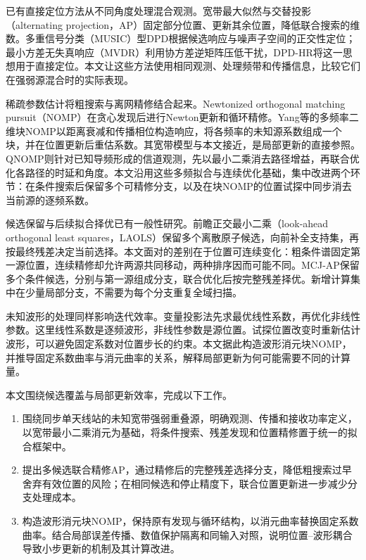 \documentclass[a4paper,fleqn]{cas-sc}
\numberwithin{equation}{section}
\numberwithin{figure}{section}
\numberwithin{table}{section}
\begin{document}
已有直接定位方法从不同角度处理混合观测。宽带最大似然与交替投影（alternating projection，AP）固定部分位置、更新其余位置，降低联合搜索的维数\cite{ChenHudsonYao2002}。多重信号分类（MUSIC）型DPD根据候选响应与噪声子空间的正交性定位\cite{WeissAmar2005}；最小方差无失真响应（MVDR）利用协方差逆矩阵压低干扰\cite{Capon1969}，DPD-HR将这一思想用于直接定位\cite{TirerWeiss2016}。本文让这些方法使用相同观测、处理频带和传播信息，比较它们在强弱源混合时的实际表现。

稀疏参数估计将粗搜索与离网精修结合起来。Newtonized orthogonal matching pursuit（NOMP）在贪心发现后进行Newton更新和循环精修\cite{Mamandipoor2016}。Yang等的多频率二维块NOMP以距离衰减和传播相位构造响应，将各频率的未知源系数组成一个块，并在位置更新后重估系数\cite{Yang2022}。其宽带模型与本文接近，是局部更新的直接参照。QNOMP则针对已知导频形成的信道观测，先以最小二乘消去路径增益，再联合优化各路径的时延和角度\cite{Zeng2025}。本文沿用这些多频拟合与连续优化基础，集中改进两个环节：在条件搜索后保留多个可精修分支，以及在块NOMP的位置试探中同步消去当前源的逐频系数。

候选保留与后续拟合择优已有一般性研究。前瞻正交最小二乘（look-ahead orthogonal least squares，LAOLS）保留多个离散原子候选，向前补全支持集，再按最终残差决定当前选择\cite{Chatterjee2012}。本文面对的差别在于位置可连续变化：粗条件谱固定第一源位置，连续精修却允许两源共同移动，两种排序因而可能不同。MCJ-AP保留多个条件候选，分别与第一源组成分支，联合优化后按完整残差择优。新增计算集中在少量局部分支，不需要为每个分支重复全域扫描。

未知波形的处理同样影响迭代效率。变量投影法先求最优线性系数，再优化非线性参数\cite{GolubPereyra1973}。这里线性系数是逐频波形，非线性参数是源位置。试探位置改变时重新估计波形，可以避免固定系数对位置步长的约束。本文据此构造波形消元块NOMP，并推导固定系数曲率与消元曲率的关系，解释局部更新为何可能需要不同的计算量。

本文围绕候选覆盖与局部更新效率，完成以下工作。
\begin{enumerate}
  \item 围绕同步单天线站的未知宽带强弱重叠源，明确观测、传播和接收功率定义，以宽带最小二乘消元为基础，将条件搜索、残差发现和位置精修置于统一的拟合框架中。
  \item 提出多候选联合精修AP，通过精修后的完整残差选择分支，降低粗搜索过早舍弃有效位置的风险；在相同候选和停止精度下，联合位置更新进一步减少分支处理成本。
  \item 构造波形消元块NOMP，保持原有发现与循环结构，以消元曲率替换固定系数曲率。结合局部误差传播、数值保护隔离和同输入对照，说明位置--波形耦合导致小步更新的机制及其计算改进。
\end{enumerate}
\end{document}
